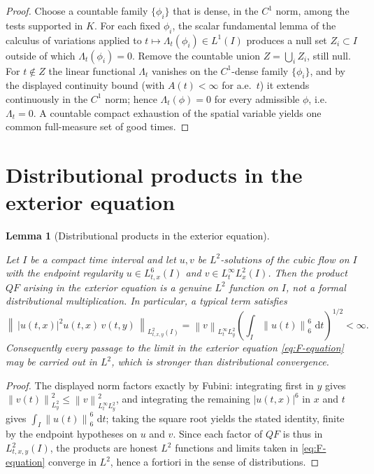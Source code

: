 \documentclass[11pt,oneside]{book}
\providecommand{\uses}[1]{}
\newtheorem{lemma}[theorem]{Lemma}
\theoremstyle{definition}
\theoremstyle{remark}
\newcommand{\1}{\mathbf 1}
\newcommand{\dd}{\,\mathrm d}
\newcommand{\norm}[1]{\left\lVert #1\right\rVert}
\newcommand{\abs}[1]{\left\lvert #1\right\rvert}
\begin{document}
\begin{proof}
\uses{lem:tensor-test-density}
Choose a countable family $\{\phi_i\}$ that is dense, in the $C^1$ norm, among
the tests supported in $K$. For each fixed $\phi_i$, the scalar fundamental
lemma of the calculus of variations applied to
$t\mapsto\Lambda_t(\phi_i)\in L^1(I)$ produces a null set $Z_i\subset I$
outside of which $\Lambda_t(\phi_i)=0$. Remove the countable union
$Z=\bigcup_i Z_i$, still null. For $t\notin Z$ the linear functional
$\Lambda_t$ vanishes on the $C^1$-dense family $\{\phi_i\}$, and by the
displayed continuity bound (with $A(t)<\infty$ for a.e.\ $t$) it extends
continuously in the $C^1$ norm; hence $\Lambda_t(\phi)=0$ for every admissible
$\phi$, i.e.\ $\Lambda_t=0$. A countable compact exhaustion of the spatial
variable yields one common full-measure set of good times.
\end{proof}

\section{Distributional products in the exterior equation}

\begin{lemma}[Distributional products in the exterior equation]
\label{lem:distributional-products}
\uses{def:exterior-product}
Let $I$ be a compact time interval and let $u,v$ be $L^2$-solutions of the
cubic flow on $I$ with the endpoint regularity $u\in L^6_{t,x}(I)$ and
$v\in L^\infty_tL^2_x(I)$. Then the product $QF$ arising in the exterior
equation is a genuine $L^2$ function on $I$, not a formal distributional
multiplication. In particular, a typical term satisfies
\[
 \norm{\,\abs{u(t,x)}^2u(t,x)\,v(t,y)\,}_{L^2_{t,x,y}(I)}
 =\norm v_{L^\infty_tL^2_y}
 \left(\int_I\norm{u(t)}_6^6\,\dd t\right)^{1/2}<\infty .
\]
Consequently every passage to the limit in the exterior equation
\eqref{eq:F-equation} may be carried out in $L^2$, which is stronger than
distributional convergence.\end{lemma}

\begin{proof}
\uses{def:exterior-product}
The displayed norm factors exactly by Fubini: integrating first in $y$ gives
$\norm{v(t)}_{L^2_y}^2\le\norm v_{L^\infty_tL^2_y}^2$, and integrating the
remaining $\abs{u(t,x)}^6$ in $x$ and $t$ gives
$\int_I\norm{u(t)}_6^6\,\dd t$; taking the square root yields the stated
identity, finite by the endpoint hypotheses on $u$ and $v$. Since each factor
of $QF$ is thus in $L^2_{t,x,y}(I)$, the products are honest $L^2$ functions
and limits taken in \eqref{eq:F-equation} converge in $L^2$, hence a fortiori
in the sense of distributions.
\end{proof}
\end{document}
